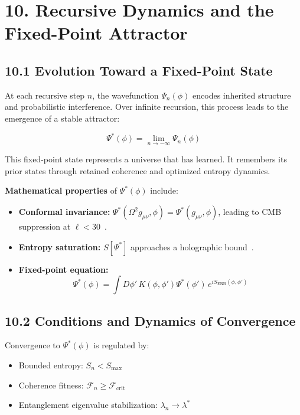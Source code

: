 \section*{10. Recursive Dynamics and the Fixed-Point Attractor}

\subsection*{10.1 Evolution Toward a Fixed-Point State}

At each recursive step \( n \), the wavefunction \( \Psi_n(\phi) \) encodes inherited structure and probabilistic interference. Over infinite recursion, this process leads to the emergence of a stable attractor:

\[
\Psi^*(\phi) = \lim_{n \to -\infty} \Psi_n(\phi)
\]

This fixed-point state represents a universe that has learned. It remembers its prior states through retained coherence and optimized entropy dynamics.

\textbf{Mathematical properties} of \( \Psi^*(\phi) \) include:
\begin{itemize}
  \item \textbf{Conformal invariance:} \( \Psi^*(\Omega^2 g_{\mu\nu}, \phi) = \Psi^*(g_{\mu\nu}, \phi) \), leading to CMB suppression at \( \ell < 30 \)~\cite{penrose2010cycles}.
  \item \textbf{Entropy saturation:} \( S[\Psi^*] \) approaches a holographic bound~\cite{bousso2002holographic}.
  \item \textbf{Fixed-point equation:}
  \[
  \Psi^*(\phi) = \int D\phi' \, K(\phi, \phi') \Psi^*(\phi') \, e^{i S_{\text{ERB}}(\phi, \phi')}
  \]
\end{itemize}

\subsection*{10.2 Conditions and Dynamics of Convergence}

Convergence to \( \Psi^*(\phi) \) is regulated by:
\begin{itemize}
  \item Bounded entropy: \( S_n < S_{\text{max}} \)
  \item Coherence fitness: \( \mathcal{F}_n \geq \mathcal{F}_{\text{crit}} \)~\cite{zurek_quantum_2009}
  \item Entanglement eigenvalue stabilization: \( \lambda_n \to \lambda^* \)
\end{itemize}

